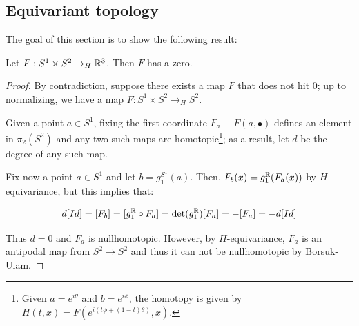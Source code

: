 \documentclass[10pt]{article}
\begin{document}
	\subsection{Equivariant topology}
        
	The goal of this section is to show the following result:

	\begin{theorem}
		Let $F:S^1\times S^2 \rightarrow_H \mathbb{R}^3$. Then $F$ has a zero.
	\end{theorem}

	\begin{proof}
		By contradiction, suppose there exists a map $F$ that does not hit $0$; up to normalizing, we have a map 
		$F: S^1\times S^2 \rightarrow_H S^2$.

		Given a point $a\in S^1$, fixing the first coordinate $F_a \equiv F(a, \bullet)$ defines an element in $\pi_2(S^2)$ 
		and any two such maps are homotopic\footnote{Given $a= e^{i\theta}$ and $b=e^{i\phi}$, the homotopy is given by 
		$H(t, x) = F(e^{i(t\phi + (1-t)\theta)}, x)$.}; as a result, let $d$ be the degree of any such map.

		Fix now a point $a\in S^1$ and let $b=g_1^{S^1}(a)$. Then, $F_b(x)=g_1^{\mathbb{R}}(F_a(x))$ by $H$-equivariance, but
		this implies that:

		\[
			d[Id] = [F_b] = [g_1^{\mathbb{R}}\circ F_a] = \det(g_1^{\mathbb{R}})[F_a] = - [F_a] = -d[Id]
		\]

		Thus $d = 0$ and $F_a$ is nullhomotopic. However, by $H$-equivariance, $F_a$ is an antipodal map from $S^2\rightarrow S^2$ and thus it can
		not be nullhomotopic by Borsuk-Ulam.
	\end{proof}
\end{document}
